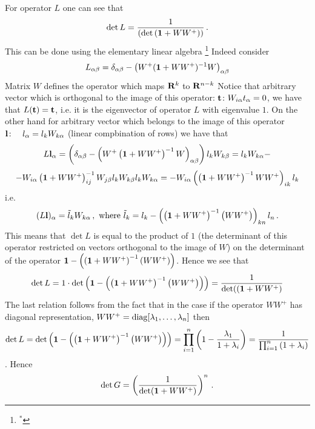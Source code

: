 For operator $L$ one can see that
          $$
\det L=  {1\over 
        \left(
   \det 
         \left( {\bf 1}+WW^+\right)
       \right)
         }\,.
           $$
This can be done using 
the elementary linear algebra
\footnote{$^*$}
{Indeed consider
                  $$
 L_{\alpha\beta}=
  \delta_{\alpha\beta}-\left(W^+({\bf 1}+WW^+)^{-1}W\right)_{\alpha\beta}
                  $$
Matrix $W$ defines the operator 
which maps ${\bf R}^k$  to ${\bf R}^{n-k}$
Notice that  arbitrary vector which is orthogonal 
to the image of this operator:
             $
{\bf t}\colon W_{i\alpha}t_\alpha=0
             $, we have that
$L({\bf t})={\bf t}$, i.e. it  
is the eigenvector of operator $L$
with eigenvalue $1$.
On the other hand 
for arbitrary vector which belongs to 
the image of this operator
                $
{\bf l}\colon \quad l_\alpha=l_k W_{k\alpha}$
(linear compbination of rows)
we have that
                     $$
L{\bf l}_\alpha=
 \left 
(\delta_{\alpha\beta}-\left(W^+\left({\bf 1}+WW^+\right)^{-1}W\right)_{\alpha\beta}
\right)l_k W_{k\beta}=l_k W_{k\alpha}-
                      $$
                       $$
  -W_{i \alpha}\left({\bf 1}+WW^+\right)^{-1}_{ij}W_{j\beta}l_k W_{k\beta}
    l_k W_{k\alpha}               =
  -W_{i \alpha}\left(\left({\bf 1}+WW^+\right)^{-1}
               WW^+\right)_{ik}l_k 
                     $$
i.e.
                  $$
(L{\bf l})_\alpha=\tilde l_k W_{k\alpha}\,,\,\,
{\rm where}\,\,
        \tilde l_k=
    l_k-  \left(\left({\bf 1}+WW^+\right)^{-1}
\left(WW^+\right)\right)_{kn}l_n\,.
                  $$
This means that $\det L$ is equal to the product of
$1$ (the determinant of this operator restricted on vectors orthogonal
to the image of $W$) on the determinant of the operator
     ${\bf 1}-\left(\left({\bf 1}+WW^+\right)^{-1}
\left(WW^+\right)\right)$. Hence we see that
                  $$
\det L=1\cdot 
            \det
                \left(
       {\bf 1}-\left(
 \left({\bf 1}+WW^+\right)^{-1}
\left(WW^+\right)\right)
              \right)
     ={1\over \det(\left({\bf 1}+WW^+\right)}
                    $$
The last relation follows from the fact  that in
the case if the operator $WW^+$ has diagonal representation,
  $WW^+={\rm diag}[\lambda_1,\dots,\lambda_n]$ then
           $$
\det L=      \det
                \left(
       {\bf 1}-\left(
 \left({\bf 1}+WW^+\right)^{-1}
\left(WW^+\right)\right)
              \right)=
\prod_{i=1}^n
        \left(
       1-{\lambda_1\over 1+\lambda_i}
          \right)
         =
      {1\over \prod_{i=1}^n \left(1+\lambda_i\right)}
           $$
}.
Hence
              $$
\det G=
       \left(
{1\over  {\det ({\bf 1}+WW^+) }}
       \right)^{n}\,.
                 $$

